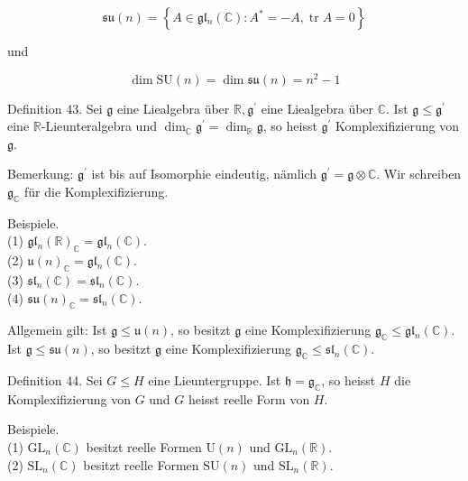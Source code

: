 \documentclass[10pt, letterpaper]{article}
\begin{document}
$$
\mathfrak{s} \mathfrak{u}(n)=\left\{A \in \mathfrak{g} \mathfrak{l}_{n}(\mathbb{C}): A^{*}=-A, \operatorname{tr} A=0\right\}
$$

und

$$
\operatorname{dim} \mathrm{SU}(n)=\operatorname{dim} \mathfrak{s u}(n)=n^{2}-1
$$

Definition 43. Sei $\mathfrak{g}$ eine Liealgebra über $\mathbb{R}, \mathfrak{g}^{\prime}$ eine Liealgebra über $\mathbb{C}$. Ist $\mathfrak{g} \leq \mathfrak{g}^{\prime}$ eine $\mathbb{R}$-Lieunteralgebra und $\operatorname{dim}_{\mathbb{C}} \mathfrak{g}^{\prime}=\operatorname{dim}_{\mathbb{R}} \mathfrak{g}$, so heisst $\mathfrak{g}^{\prime}$ Komplexifizierung von $\mathfrak{g}$.

Bemerkung: $\mathfrak{g}^{\prime}$ ist bis auf Isomorphie eindeutig, nämlich $\mathfrak{g}^{\prime}=\mathfrak{g} \otimes \mathbb{C}$. Wir schreiben $\mathfrak{g}_{\mathbb{C}}$ für die Komplexifizierung.

Beispiele.\\
(1) $\mathfrak{g} \mathfrak{l}_{n}(\mathbb{R})_{\mathbb{C}}=\mathfrak{g} \mathfrak{l}_{n}(\mathbb{C})$.\\
(2) $\mathfrak{u}(n)_{\mathbb{C}}=\mathfrak{g} \mathfrak{l}_{n}(\mathbb{C})$.\\
(3) $\mathfrak{s} \mathfrak{l}_{n}(\mathbb{C})=\mathfrak{s} \mathfrak{l}_{n}(\mathbb{C})$.\\
(4) $\mathfrak{s u}(n)_{\mathbb{C}}=\mathfrak{s} \mathfrak{l}_{n}(\mathbb{C})$.

Allgemein gilt: Ist $\mathfrak{g} \leq \mathfrak{u}(n)$, so besitzt $\mathfrak{g}$ eine Komplexifizierung $\mathfrak{g}_{\mathbb{C}} \leq \mathfrak{g} \mathfrak{l}_{n}(\mathbb{C})$. Ist $\mathfrak{g} \leq \mathfrak{s} \mathfrak{u}(n)$, so besitzt $\mathfrak{g}$ eine Komplexifizierung $\mathfrak{g}_{\mathbb{C}} \leq \mathfrak{s} \mathfrak{l}_{n}(\mathbb{C})$.

Definition 44. Sei $G \leq H$ eine Lieuntergruppe. Ist $\mathfrak{h}=\mathfrak{g}_{\mathbb{C}}$, so heisst $H$ die Komplexifizierung von $G$ und $G$ heisst reelle Form von $H$.

Beispiele.\\
(1) $\mathrm{GL}_{n}(\mathbb{C})$ besitzt reelle Formen $\mathrm{U}(n)$ und $\mathrm{GL}_{n}(\mathbb{R})$.\\
(2) $\mathrm{SL}_{n}(\mathbb{C})$ besitzt reelle Formen $\mathrm{SU}(n)$ und $\mathrm{SL}_{n}(\mathbb{R})$.



\pagebreak
\end{document}
